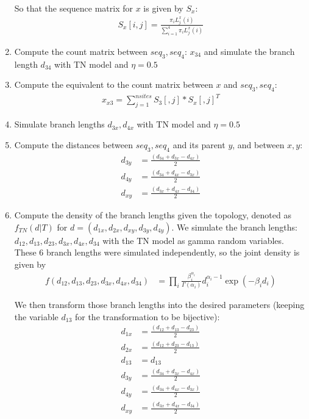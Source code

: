 \documentclass[12pt,letterpaper]{article}
\begin{document}
\begin{enumerate}
So that the sequence matrix for $x$ is given by $S_x$:
\begin{align*}
S_x[i,j] = \frac{\pi_i L^x_j(i)}{\sum_{i=1}^4 \pi_i L^x_j(i)}
\end{align*}

\item Compute the count matrix between $seq_3,seq_4$: $x_{34}$ and
  simulate the branch length $d_{34}$ with TN model and
  $\eta=0.5$
\item Compute the equivalent to the count matrix between $x$ and
  $seq_3,seq_4$:
\begin{align*}
x_{x3}=\sum_{j=1}^{nsites} S_3[,j]*S_x[,j]^T
\end{align*}
\item Simulate branch lengths $d_{3x}, d_{4x}$ with TN model
  and $\eta=0.5$
\item Compute the distances between $seq_3,seq_4$ and its parent $y$,
  and between $x,y$:
\begin{align*}
  d_{3y} &= \frac{(d_{34}+d_{3x}-d_{4x})}{2} \\
  d_{4y} &= \frac{(d_{34}+d_{4x}-d_{3x})}{2} \\
  d_{xy} &= \frac{(d_{3x}+d_{4x}-d_{34})}{2}
\end{align*}

\item Compute the density of the branch lengths given the topology,
  denoted as $f_{TN}(d|T)$ for
  $d=(d_{1x},d_{2x},d_{xy},d_{3y},d_{4y})$.  We simulate the branch
  lengths: $d_{12},d_{13},d_{23},d_{3x},d_{4x},d_{34}$ with the TN
  model as gamma random variables. These 6 branch lengths
  were simulated independently, so the joint density is given by
  \begin{align*}
    f(d_{12},d_{13},d_{23},d_{3x},d_{4x},d_{34}) &= \prod_{i}
    \frac{\beta_i^{\alpha_i}}{\Gamma(\alpha_i)} d_i^{\alpha_i-1} \exp{(-\beta_id_i)}
  \end{align*}

  We then transform those branch lengths into the desired parameters
  (keeping the variable $d_{13}$ for the transformation to be
  bijective):
  \begin{align*}
    d_{1x} &= \frac{(d_{12}+d_{13}-d_{23})}{2} \\
    d_{2x} &= \frac{(d_{12}+d_{23}-d_{13})}{2} \\
    d_{13} &= d_{13} \\
    d_{3y} &= \frac{(d_{34}+d_{3x}-d_{4x})}{2} \\
    d_{4y} &= \frac{(d_{34}+d_{4x}-d_{3x})}{2} \\
    d_{xy} &= \frac{(d_{3x}+d_{4x}-d_{34})}{2}
  \end{align*}


\end{enumerate}
\end{document}
